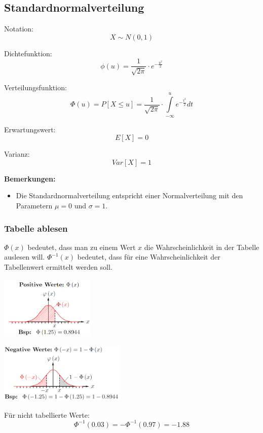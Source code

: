 \documentclass[10pt,a4paper,twocolumn]{article}
\begin{document}
\subsection{Standardnormalverteilung}
Notation:
\[
X \sim N(0,1)
\]

Dichtefunktion:
\[
\phi(u)=\frac{1}{\sqrt{2\pi}}\cdot e^{-\frac{u^2}{2}}
\]

Verteilungsfunktion:
\[
\Phi(u)=P[X \leq u]=\frac{1}{\sqrt{2\pi}}\cdot\int \limits_{-\infty}^u e^{-\frac{t^2}{2}}dt
\]

Erwartungswert:
\[
E[X]=0
\]

Varianz:
\[
Var[X]=1
\]

\textbf{Bemerkungen:}
\begin{itemize}
\item Die Standardnormalverteilung entspricht einer Normalverteilung mit den Parametern $\mu = 0$ und $\sigma = 1$.
\end{itemize}

\subsubsection{Tabelle ablesen}
$\Phi(x)$ bedeutet, dass man zu einem Wert $x$ die Wahrscheinlichkeit in der Tabelle auslesen will. $\Phi^{-1}(x)$ bedeutet, dass für eine Wahrscheinlichkeit der Tabellenwert ermittelt werden soll.

\begin{center}
\includegraphics[width=45mm]{standardnormalverteilung_tabelle1.png}
\end{center}
\begin{center}
\includegraphics[width=60mm]{standardnormalverteilung_tabelle2.png}
\end{center}

Für nicht tabellierte Werte:
\[
\Phi^{-1}(0.03)=-\Phi^{-1}(0.97)=-1.88
\]
\end{document}
